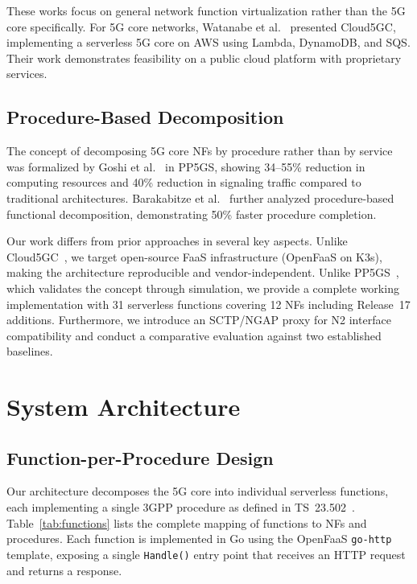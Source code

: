 \documentclass[conference]{IEEEtran}
\begin{document}
These works focus on general network function virtualization rather than the 5G core specifically. For 5G core networks, Watanabe et al.~\cite{cloud5gc-2024} presented Cloud5GC, implementing a serverless 5G core on AWS using Lambda, DynamoDB, and SQS. Their work demonstrates feasibility on a public cloud platform with proprietary services.

\subsection{Procedure-Based Decomposition}

The concept of decomposing 5G core NFs by procedure rather than by service was formalized by Goshi et al.~\cite{pp5gs-2023} in PP5GS, showing 34--55\% reduction in computing resources and 40\% reduction in signaling traffic compared to traditional architectures. Barakabitze et al.~\cite{proc-decomp-2022} further analyzed procedure-based functional decomposition, demonstrating 50\% faster procedure completion.

Our work differs from prior approaches in several key aspects. Unlike Cloud5GC~\cite{cloud5gc-2024}, we target open-source FaaS infrastructure (OpenFaaS on K3s), making the architecture reproducible and vendor-independent. Unlike PP5GS~\cite{pp5gs-2023}, which validates the concept through simulation, we provide a complete working implementation with 31 serverless functions covering 12 NFs including Release~17 additions. Furthermore, we introduce an SCTP/NGAP proxy for N2 interface compatibility and conduct a comparative evaluation against two established baselines.

\section{System Architecture}
\label{sec:architecture}

\subsection{Function-per-Procedure Design}

Our architecture decomposes the 5G core into individual serverless functions, each implementing a single 3GPP procedure as defined in TS~23.502~\cite{3gpp-23502}. Table~\ref{tab:functions} lists the complete mapping of functions to NFs and procedures. Each function is implemented in Go using the OpenFaaS \texttt{go-http} template, exposing a single \texttt{Handle()} entry point that receives an HTTP request and returns a response.
\end{document}
